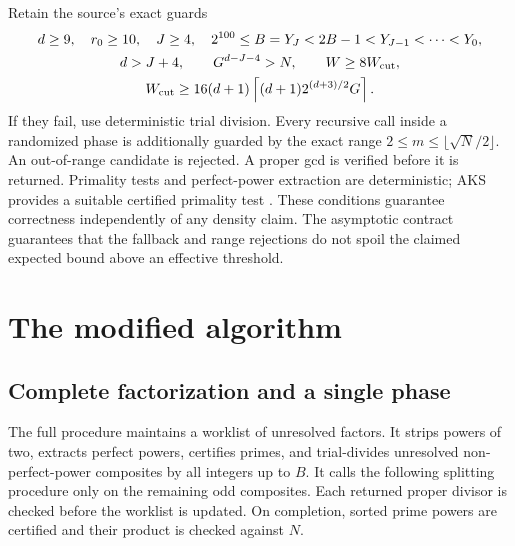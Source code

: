 Retain the source's exact guards
\begin{gather*}
 d\ge9,\quad r_0\ge10,\quad J\ge4,\quad
 2^{100}\le B=Y_J<2B-1<Y_{J-1}<\cdots<Y_0,\\
 d>J+4,\qquad G^{d-J-4}>N,\qquad W\ge8W_{\rm cut},\\
 W_{\rm cut}\ge16(d+1)
       \left\lceil(d+1)2^{(d+3)/2}G\right\rceil.
\end{gather*}
If they fail, use deterministic trial division.  Every recursive
call inside a randomized phase is additionally guarded by the exact
range $2\le m\le\lfloor\sqrt N/2\rfloor$.  An out-of-range candidate
is rejected.  A proper gcd is verified before it is returned.
Primality tests and perfect-power extraction are deterministic;
AKS provides a suitable certified primality test \cite{AKS2004}.
These conditions guarantee correctness independently of any density
claim.  The asymptotic contract guarantees that the fallback and
range rejections do not spoil the claimed expected bound above an
effective threshold.

\section{The modified algorithm}
\label{rf:algorithm}

\subsection{Complete factorization and a single phase}

The full procedure maintains a worklist of unresolved factors.
It strips powers of two, extracts perfect powers, certifies primes,
and trial-divides unresolved non-perfect-power composites by all
integers up to $B$.  It calls the following splitting procedure only
on the remaining odd composites.  Each returned proper divisor is
checked before the worklist is updated.  On completion, sorted prime
powers are certified and their product is checked against $N$.

